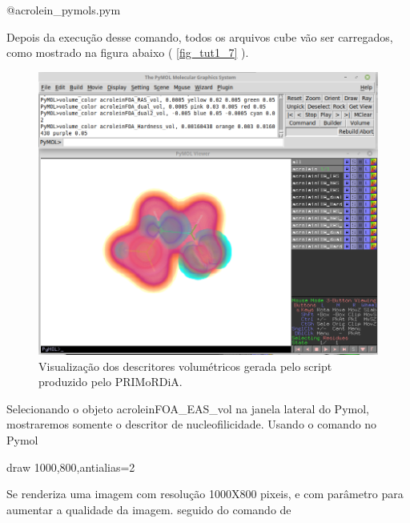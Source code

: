 \documentclass[a4paper,11pt]{refart}
\begin{document}
\hspace*{-\leftmarginwidth}
\begin{minipage}{\fullwidth}
	\begin{pymol}@acrolein_pymols.pym\end{pymol}
\end{minipage}

Depois da execução desse comando, todos os arquivos cube vão ser carregados, como mostrado na figura abaixo ( \autoref{fig_tut1_7} ). 

\hspace*{-\leftmarginwidth}
\begin{minipage}{\fullwidth}
\begin{figure}[H]
\begin{center}
\includegraphics[width=4.5in]{images/img8}
\caption{Visualização dos descritores volumétricos gerada pelo script produzido pelo PRIMoRDiA.}
\label{fig_tut1_7}
\end{center}
\end{figure}
\end{minipage}

Selecionando o objeto acroleinFOA\_EAS\_vol na janela lateral do Pymol, mostraremos somente o descritor de nucleofilicidade. Usando o comando no Pymol


\hspace*{-\leftmarginwidth}
\begin{minipage}{\fullwidth}
	\begin{pymol}draw 1000,800,antialias=2\end{pymol}
\end{minipage}


Se renderiza uma imagem com resolução 1000X800 pixeis, e com parâmetro para aumentar a qualidade da imagem. seguido do comando de
\end{document}
